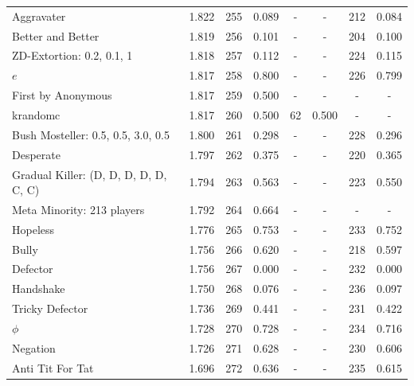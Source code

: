 \begin{tabular}{lccccccc}
Aggravater & 1.822 & 255 & 0.089 & - & - & 212 & 0.084 \\
Better and Better & 1.819 & 256 & 0.101 & - & - & 204 & 0.100 \\
ZD-Extortion: 0.2, 0.1, 1 & 1.818 & 257 & 0.112 & - & - & 224 & 0.115 \\
$e$ & 1.817 & 258 & 0.800 & - & - & 226 & 0.799 \\
First by Anonymous & 1.817 & 259 & 0.500 & - & - & - & - \\
krandomc & 1.817 & 260 & 0.500 & 62 & 0.500 & - & - \\
Bush Mosteller: 0.5, 0.5, 3.0, 0.5 & 1.800 & 261 & 0.298 & - & - & 228 & 0.296 \\
Desperate & 1.797 & 262 & 0.375 & - & - & 220 & 0.365 \\
Gradual Killer: (D, D, D, D, D, C, C) & 1.794 & 263 & 0.563 & - & - & 223 & 0.550 \\
Meta Minority: 213 players & 1.792 & 264 & 0.664 & - & - & - & - \\
Hopeless & 1.776 & 265 & 0.753 & - & - & 233 & 0.752 \\
Bully & 1.756 & 266 & 0.620 & - & - & 218 & 0.597 \\
Defector & 1.756 & 267 & 0.000 & - & - & 232 & 0.000 \\
Handshake & 1.750 & 268 & 0.076 & - & - & 236 & 0.097 \\
Tricky Defector & 1.736 & 269 & 0.441 & - & - & 231 & 0.422 \\
$\phi$ & 1.728 & 270 & 0.728 & - & - & 234 & 0.716 \\
Negation & 1.726 & 271 & 0.628 & - & - & 230 & 0.606 \\
Anti Tit For Tat & 1.696 & 272 & 0.636 & - & - & 235 & 0.615 \\
\bottomrule
\end{tabular}
